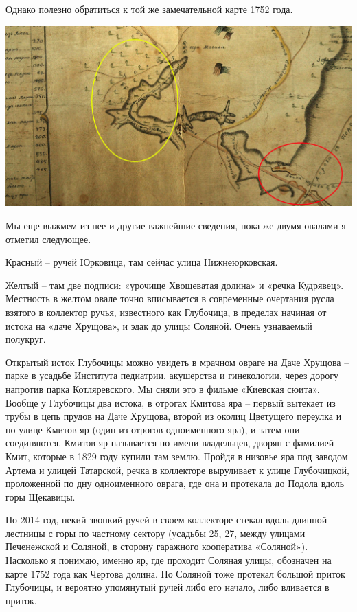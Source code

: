 Однако полезно обратиться к той же замечательной карте 1752 года.

\begin{center}
\includegraphics[width=\linewidth]{chast-colebanie-osnov/pochayna/kudr.jpg}
\end{center}

Мы еще выжмем из нее и другие важнейшие сведения, пока же двумя овалами я отметил следующее.

Красный – ручей Юрковица, там сейчас улица Нижнеюрковская.

Желтый – там две подписи: «урочище Хвощеватая долина» и «речка Кудрявец». Местность в желтом овале точно вписывается в современные очертания русла взятого в коллектор ручья, известного как Глубочица, в пределах начиная от истока на «даче Хрущова», и эдак до улицы Соляной. Очень узнаваемый полукруг.

Открытый исток Глубочицы можно увидеть в мрачном овраге на Даче Хрущова – парке в усадьбе Института педиатрии, акушерства и гинекологии, через дорогу напротив парка Котляревского. Мы сняли это в фильме «Киевская сюита». Вообще у Глубочицы два истока, в отрогах Кмитова яра – первый вытекает из трубы в цепь прудов на Даче Хрущова, второй из околиц Цветущего переулка и по улице Кмитов яр (один из отрогов одноименного яра), и затем они соединяются. Кмитов яр называется по имени владельцев, дворян с фамилией Кмит, которые в 1829 году купили там землю. Пройдя в низовье яра под заводом Артема и улицей Татарской, речка в коллекторе выруливает к улице Глубочицкой, проложенной по дну одноименного оврага, где она и протекала до Подола вдоль горы Щекавицы.


По 2014 год, некий звонкий ручей в своем коллекторе стекал вдоль длинной лестницы с горы по частному сектору (усадьбы 25, 27, между улицами Печенежской и Соляной, в сторону гаражного кооператива «Соляной»). Насколько я понимаю, именно яр, где проходит Соляная улицы, обозначен на карте 1752 года как Чертова долина. По Соляной тоже протекал большой приток Глубочицы, и вероятно упомянутый ручей либо его начало, либо вливается в приток.

